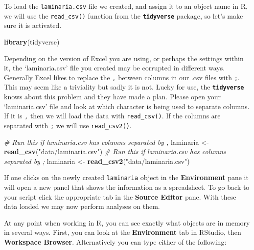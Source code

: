 \documentclass[
]{book}
\newenvironment{Shaded}{\begin{snugshade}}{\end{snugshade}}
\newcommand{\CommentTok}[1]{\textcolor[rgb]{0.56,0.35,0.01}{\textit{#1}}}
\newcommand{\KeywordTok}[1]{\textcolor[rgb]{0.13,0.29,0.53}{\textbf{#1}}}
\newcommand{\NormalTok}[1]{#1}
\newcommand{\StringTok}[1]{\textcolor[rgb]{0.31,0.60,0.02}{#1}}
\begin{document}
To load the \texttt{laminaria.csv} file we created, and assign it to an object name in R, we will use the \texttt{read\_csv()} function from the \textbf{\texttt{tidyverse}} package, so let's make sure it is activated.

\begin{Shaded}
\begin{Highlighting}[]
\KeywordTok{library}\NormalTok{(tidyverse)}
\end{Highlighting}
\end{Shaded}

Depending on the version of Excel you are using, or perhaps the settings within it, the `laminaria.csv' file you created may be corrupted in different ways. Generally Excel likes to replace the \texttt{,} between columns in our .csv files with \texttt{;}. This may seem like a triviality but sadly it is not. Lucky for use, the \textbf{\texttt{tidyverse}} knows about this problem and they have made a plan. Please open your `laminaria.csv' file and look at which character is being used to separate columns. If it is \texttt{,} then we will load the data with \texttt{read\_csv()}. If the columns are separated with \texttt{;} we will use \texttt{read\_csv2()}.

\begin{Shaded}
\begin{Highlighting}[]
\CommentTok{\# Run this if \textquotesingle{}laminaria.csv\textasciigrave{} has columns separated by \textquotesingle{},\textquotesingle{}}
\NormalTok{laminaria <{-}}\StringTok{ }\KeywordTok{read\_csv}\NormalTok{(}\StringTok{"data/laminaria.csv"}\NormalTok{)}
\CommentTok{\# Run this if \textquotesingle{}laminaria.csv\textasciigrave{} has columns separated by \textquotesingle{};\textquotesingle{}}
\NormalTok{laminaria <{-}}\StringTok{ }\KeywordTok{read\_csv2}\NormalTok{(}\StringTok{"data/laminaria.csv"}\NormalTok{)}
\end{Highlighting}
\end{Shaded}

If one clicks on the newly created \texttt{laminaria} object in the \textbf{Environment} pane it will open a new panel that shows the information as a spreadsheet. To go back to your script click the appropriate tab in the \textbf{Source Editor} pane. With these data loaded we may now perform analyses on them.

At any point when working in R, you can see exactly what objects are in memory in several ways. First, you can look at the \textbf{Environment} tab in RStudio, then \textbf{Workspace Browser}. Alternatively you can type either of the following:
\end{document}
